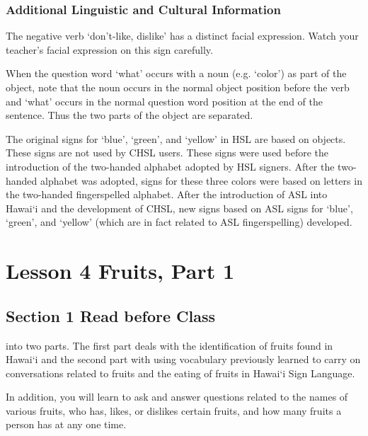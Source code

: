 \documentclass{tufte-book}
\begin{document}
\subsection{Additional Linguistic and Cultural Information}

The negative verb `don’t-like, dislike' has a distinct facial expression. Watch your teacher’s facial expression on this sign carefully.

When the question word `what' occurs with a noun (e.g. `color') as part of the object, note that the noun occurs in the normal object position before the verb and `what' occurs in the normal question word position at the end of the sentence. Thus the two parts of the object are separated. 

The original signs for `blue', `green', and `yellow' in HSL are based on objects. These signs are not used by CHSL users. These signs were used before the introduction of the two-handed alphabet adopted by HSL signers. After the two-handed alphabet was adopted, signs for these three colors were based on letters in the two-handed fingerspelled alphabet. After the introduction of ASL into Hawai`i and the development of CHSL, new signs based on ASL signs for `blue', `green', and `yellow' (which are in fact related to ASL fingerspelling) developed.




\chapter{Lesson 4 Fruits, Part 1}
\section{Section 1 Read before Class}

 into two parts. The first part deals with the identification
of fruits found in Hawai`i and the second part with using vocabulary previously
learned to carry on conversations related to fruits and the eating of fruits in Hawai`i
Sign Language.

In addition, you will learn to ask and answer questions related to the names of various fruits, who has, likes, or dislikes certain fruits, and how many fruits a person has at any one time.
\end{document}
